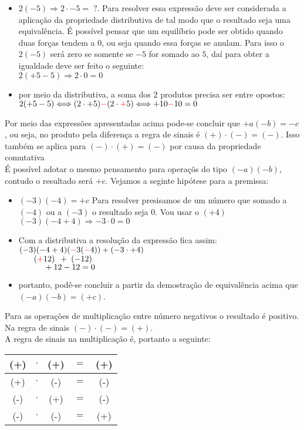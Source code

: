 \begin{itemize}
	\item $ 2(-5) \Longrightarrow 2 \cdot -5 = \;? $. Para resolver essa expressão deve ser considerada a aplicação da propriedade distributiva de tal modo que o resultado seja uma equivalência. É possível pensar que um equilíbrio pode ser obtido quando duas forças tendem a $0$, ou seja quando essa forças se anulam. Para isso o $2(-5)$ será zero se somente se $-5$ for somado ao $5$, daí para obter a igualdade deve ser feito o seguinte: \\ $ 2(+5 - 5) \Longrightarrow 2 \cdot 0 = 0 $
	\item por meio da distributiva, a soma dos $2$ produtos precisa ser entre opostos:\\ $ 2(+5-5) \Longleftrightarrow (2 \cdot +5) {\color{red}-} (2 \cdot {\color{red}+}5) \Longleftrightarrow +10 {\color{red}-} 10 = 0 $ 
\end{itemize}

Por meio das expressões apresentadas acima pode-se concluir que $ +a(-b) = -c $, ou seja, no produto pela diferença a regra de sinais é $(+) \cdot  (-) = (-) $. Isso também se aplica para $(-) \cdot  (+) = (-) $ por causa da propriedade comutativa \\

É possível adotar o mesmo pensamento para operaçõs do tipo $ (-a)(-b) $, contudo o resultado será $+c$.
Vejamos a seginte hipótese para a premissa:

\begin{itemize}
	\item $ (-3)(-4) = +c $ Para resolver presisamos de um número que somado a $(-4)$ ou a $(-3)$ o resultado seja $0$. Vou usar o $(+4)$ \\ $(-3)(-4+4) \Longrightarrow -3 \cdot 0 = 0$
	\item Com a distributiva a resolução da expressão fica assim: \\
	$ (-3)(-4+4) \\ ({\color{red}-} 3 ({\color{red}-} 4))+(-3 \cdot +4) $ \\
	$ \indent \; ({\color{red}+}12) \;\: + \; (-12) $ \\ $ \indent \indent +12 - 12 = 0 $
	\item portanto, podê-se concluir a partir da demostração de equivalência acima que \\ $ (-a)(-b) = (+c) $.
\end{itemize}

Para as operações de multiplicação entre número negativos o resultado é positivo. Na regra de sinais $ (-) \cdot (-) = (+) $. \\

A regra de sinais na multiplicação é, portanto a seguinte: 
 
 \begin{tabular}{|ccccc|}
	\hline
	(+) & $\cdot$ & (+) & $=$ & (+) \\
	\hline
	(+) & $\cdot$ & (-) & $=$ & (-) \\
	\hline
	(-) & $\cdot$ & (+) & $=$ & (-) \\
	\hline
	(-) & $\cdot$ & (-) & $=$ & (+) \\
	\hline
\end{tabular}
